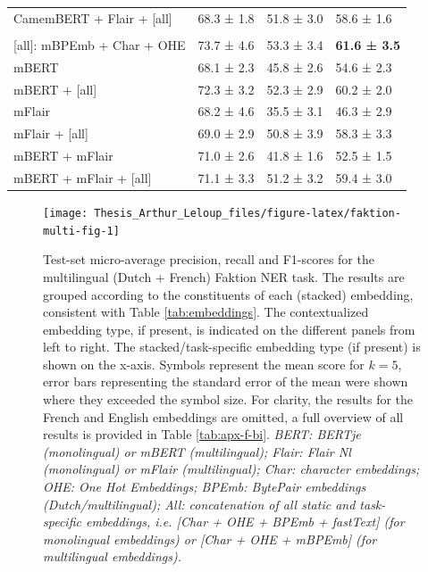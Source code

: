 \documentclass[12pt,a4paper,]{book}
\begin{document}
\begin{table}
\begin{tabular}[t]{llll}
\hspace{1em}CamemBERT + Flair + [all] & 68.3 ± 1.8 & 51.8 ± 3.0 & 58.6 ± 1.6\\
\addlinespace[0.3em]
\multicolumn{4}{l}{\textbf{Multilingual embeddings}}\\
\hspace{1em}[all]: mBPEmb + Char + OHE & 73.7 ± 4.6 & 53.3 ± 3.4 & \textbf{61.6 ± 3.5}\\
\hspace{1em}mBERT & 68.1 ± 2.3 & 45.8 ± 2.6 & 54.6 ± 2.3\\
\hspace{1em}mBERT + [all] & 72.3 ± 3.2 & 52.3 ± 2.9 & 60.2 ± 2.0\\
\hspace{1em}mFlair & 68.2 ± 4.6 & 35.5 ± 3.1 & 46.3 ± 2.9\\
\hspace{1em}mFlair + [all] & 69.0 ± 2.9 & 50.8 ± 3.9 & 58.3 ± 3.3\\
\hspace{1em}mBERT + mFlair & 71.0 ± 2.6 & 41.8 ± 1.6 & 52.5 ± 1.5\\
\hspace{1em}mBERT + mFlair + [all] & 71.1 ± 3.3 & 51.2 ± 3.2 & 59.4 ± 3.0\\
\bottomrule
\end{tabular}
\end{table}



\begin{figure}

{\centering \texttt{[image: Thesis\_Arthur\_Leloup\_files/figure-latex/faktion-multi-fig-1]} 

}

\caption{Test-set micro-average precision, recall and F1-scores for the multilingual (Dutch + French) Faktion NER task. The results are grouped according to the constituents of each (stacked) embedding, consistent with Table \ref{tab:embeddings}. The contextualized embedding type, if present, is indicated on the different panels from left to right. The stacked/task-specific embedding type (if present) is shown on the x-axis. Symbols represent the mean score for \(k = 5\), error bars representing the standard error of the mean were shown where they exceeded the symbol size. For clarity, the results for the French and English embeddings are omitted, a full overview of all results is provided in Table \ref{tab:apx-f-bi}. \emph{BERT: BERTje (monolingual) or mBERT (multilingual); Flair: Flair Nl (monolingual) or mFlair (multilingual); Char: character embeddings; OHE: One Hot Embeddings; BPEmb: BytePair embeddings (Dutch/multilingual); All: concatenation of all static and task-specific embeddings, i.e. {[}Char + OHE + BPEmb + fastText{]} (for monolingual embeddings) or {[}Char + OHE + mBPEmb{]} (for multilingual embeddings).}}\label{fig:faktion-multi-fig}
\end{figure}
\end{document}
